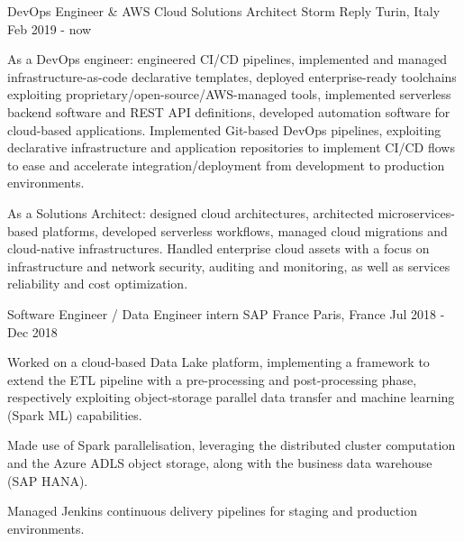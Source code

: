 \begin{cventries}
  \cventry
    {DevOps Engineer \& AWS Cloud Solutions Architect} %
    {Storm Reply} %
    {Turin, Italy} %
    {Feb 2019 - now} %
    {
        \begin{cvitems} %
\item As a DevOps engineer: engineered CI/CD pipelines, implemented and managed infrastructure-as-code declarative templates, deployed enterprise-ready toolchains exploiting proprietary/open-source/AWS-managed tools, implemented serverless backend software and REST API definitions, developed automation software for cloud-based applications. Implemented Git-based DevOps pipelines, exploiting declarative infrastructure and application repositories to implement CI/CD flows to ease and accelerate integration/deployment from development to production environments.
\item As a Solutions Architect: designed cloud architectures, architected microservices-based platforms, developed serverless workflows, managed cloud migrations and cloud-native infrastructures. Handled enterprise cloud assets with a focus on infrastructure and network security, auditing and monitoring, as well as services reliability and cost optimization.
        \end{cvitems}
    }

  \cventry
    {Software Engineer / Data Engineer intern} %
    {SAP France} %
    {Paris, France} %
    {Jul 2018 - Dec 2018} %
    {
      \begin{cvitems} %
\item Worked on a cloud-based Data Lake platform, implementing a framework to extend the ETL pipeline with a pre-processing and post-processing phase, respectively exploiting object-storage parallel data transfer and machine learning (Spark ML) capabilities.
\item Made use of Spark parallelisation, leveraging the distributed cluster computation and the Azure ADLS object storage, along with the business data warehouse (SAP HANA).
\item Managed Jenkins continuous delivery pipelines for staging and production environments.
      \end{cvitems}
    }
\end{cventries}
